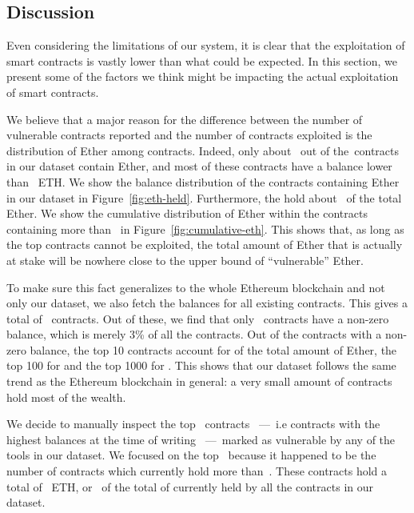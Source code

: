 \subsection{Discussion}
\label{sec:5a:discussion}

Even considering the limitations of our system, it is clear that the exploitation of smart contracts is vastly lower than what could be expected. In this section, we present some of the factors we think might be impacting the actual exploitation of smart contracts.


We believe that a major reason for the difference between the number of vulnerable contracts reported and the number of contracts exploited is the distribution of Ether among contracts. Indeed, only about~ out of the~\VulnerableContracts contracts in our dataset contain Ether, and most of these contracts have a balance lower than~ ETH.
We show the balance distribution of the contracts containing Ether in our dataset in Figure~\ref{fig:eth-held}. Furthermore, the  hold about~ of the total Ether. We show the cumulative distribution of Ether within the contracts containing more than~ in Figure~\ref{fig:cumulative-eth}. This shows that, as long as the top contracts cannot be exploited, the total amount of Ether that is actually at stake will be nowhere close to the upper bound of ``vulnerable'' Ether.

To make sure this fact generalizes to the whole Ethereum blockchain and not only our dataset, we also fetch the balances for all existing contracts. This gives a total of~ contracts. Out of these, we find that only~ contracts have a non-zero balance, which is merely 3\% of all the contracts. Out of the contracts with a non-zero balance, the top 10 contracts account for  of the total amount of Ether, the top 100 for  and the top 1000 for . This shows that our dataset follows the same trend as the Ethereum blockchain in general: a very small amount of contracts hold most of the wealth.

We decide to manually inspect the top~ contracts~ ---~i.e contracts with the highest balances at the time of writing~ ---~marked as vulnerable by any of the tools in our dataset. We focused on the top~ because it happened to be the number of contracts which currently hold more than~. These contracts hold a total of~ ETH, or~ of the total of  currently held by all the contracts in our dataset.


